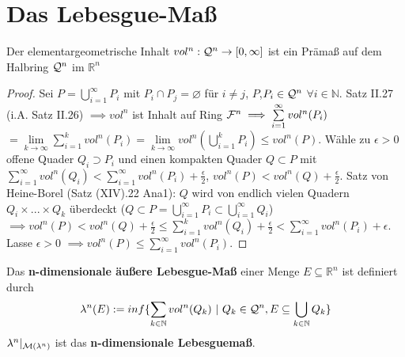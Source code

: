 \chapter{Das Lebesgue-Maß}
  \begin{lemma}
    Der elementargeometrische Inhalt $vol^n: \mathcal{Q}^n \to [0, \infty]$ ist ein Prämaß auf dem Halbring $\mathcal{Q}^n$ im $\mathbb{R}^n$
  \end{lemma}

  \begin{proof}
    Sei $P = \bigcup\limits_{i=1}^{\infty}P_i$ mit $P_i \cap P_j = \varnothing$ für $i\neq j$, $P$,$P_i \in \mathcal{Q}^n$ $\forall i\in \mathbb{N}$. \newline
    Satz II.27 (i.A. Satz II.26) $\implies vol^n$ ist Inhalt auf Ring $\mathcal{F}^n  \implies \sum\limits_{i=1}^{\infty}vol^n(P_i)$ \newline $= \lim\limits_{k\to\infty}\sum\limits_{i=1}^{k}vol^n(P_i) = \lim\limits_{k\to\infty}vol^n(\bigcup\limits_{i=1}^{k}P_i) \leq vol^n(P)$. \newline
    Wähle zu $\epsilon > 0$ offene Quader $Q_i \supset P_i$ und einen kompakten Quader $Q \subset P$ mit $\sum\limits_{i=1}^{\infty}vol^n(Q_i) < \sum\limits_{i=1}^{\infty} vol^n(P_i) + \frac{\epsilon}{2}$, $vol^n(P)<vol^n(Q)+\frac{\epsilon}{2}$. \newline
    Satz von Heine-Borel (Satz (XIV).22 Ana1): $Q$ wird von endlich vielen Quadern \newline $Q_i\times ... \times Q_k$ überdeckt ($Q\subset P = \bigcup\limits_{i=1}^{\infty}P_i \subset  \bigcup\limits_{i=1}^{\infty}Q_i$) \newline $\implies vol^n(P) < vol^n(Q) +\frac{\epsilon}{2} \leq \sum\limits_{i=1}^{k}vol^n(Q_i) + \frac{\epsilon}{2} < \sum\limits_{i=1}^{\infty}vol^n(P_i)+\epsilon$. \newline
    Lasse $\epsilon > 0$ $\implies vol^n(P) \leq \sum\limits_{i=1}^{\infty}vol^n(P_i)$. 
  \end{proof}

  \begin{definition}
    Das \textbf{n-dimensionale äußere Lebesgue-Maß} einer Menge $E \subseteq \mathbb{R}^n$ ist definiert durch
    \begin{align*}
      \lambda^n(E) := inf\{\sum\limits_{k \in \mathbb{N}} vol^n(Q_k) \ | \ Q_k \in \mathcal{Q}^n, E \subseteq \bigcup\limits_{k \in \mathbb{N}} Q_k\}
    \end{align*}
    $\lambda^n|_{\mathcal{M}(\lambda^n)}$ ist das \textbf{n-dimensionale Lebesguemaß}.
  \end{definition}

